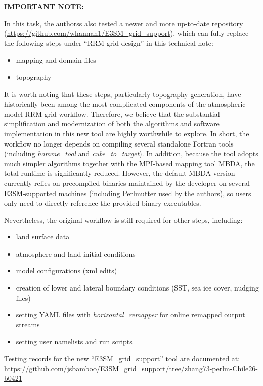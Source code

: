 \documentclass[journal abbreviation, manuscript]{copernicus}
\begin{document}
\textbf{IMPORTANT NOTE:}

In this task, the authorss also tested a newer and more up-to-date repository (\url{https://github.com/whannah1/E3SM_grid_support}), which can fully replace the following steps under ``RRM grid design'' in this technical note:
\begin{itemize}
  \item mapping and domain files
  \item topography
\end{itemize}

It is worth noting that these steps, particularly topography generation, have historically been among the most complicated components of the atmospheric-model RRM grid workflow. Therefore, we believe that the substantial simplification and modernization of both the algorithms and software implementation in this new tool are highly worthwhile to explore. In short, the workflow no longer depends on compiling several standalone Fortran tools (including \emph{homme\_tool} and \emph{cube\_to\_target}). In addition, because the tool adopts much simpler algorithms together with the MPI-based mapping tool MBDA, the total runtime is significantly reduced. However, the default MBDA version currently relies on precompiled binaries maintained by the developer on several E3SM-supported machines (including Perlmutter used by the authors), so users only need to directly reference the provided binary executables.
\vspace{\baselineskip}

Nevertheless, the original workflow is still required for other steps, including:
\begin{itemize}
  \item land surface data
  \item atmosphere and land initial conditions
  \item model configurations (xml edits)
  \item creation of lower and lateral boundary conditions (SST, sea ice cover, nudging files)
  \item setting YAML files with \emph{horizontal\_remapper} for online remapped output streams
  \item setting user namelists and run scripts
\end{itemize}
\vspace{\baselineskip}

Testing records for the new ``E3SM\_grid\_support'' tool are documented at:
\url{https://github.com/jsbamboo/E3SM_grid_support/tree/zhang73-perlm-Chile26-b0421}
\end{document}
